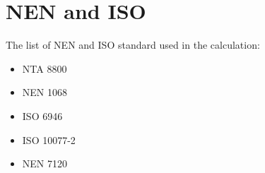 \chapter{NEN and ISO}

The list of NEN and ISO standard used in the calculation:

\begin{itemize}
    \item NTA 8800
    \item NEN 1068
    \item ISO 6946
    \item ISO 10077-2
    \item NEN 7120
\end{itemize}

